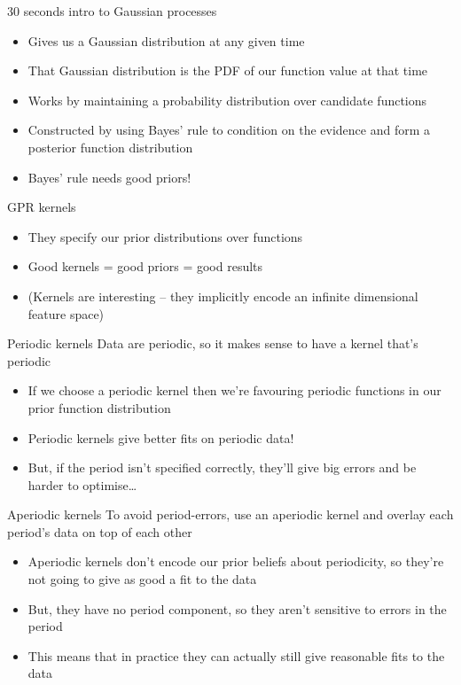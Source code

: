 \documentclass[presentation]{beamer}
\begin{document}
\begin{frame}[label={sec:org773a803}]{30 seconds intro to Gaussian processes}
\begin{itemize}
\item Gives us a Gaussian distribution at any given time
\item That Gaussian distribution is the PDF of our function value at that time
\item Works by maintaining a probability distribution over candidate functions
\item Constructed by using Bayes' rule to condition on the evidence and form a posterior function distribution
\item Bayes' rule needs good priors!
\end{itemize}
\end{frame}

\begin{frame}[label={sec:org6d04eae}]{GPR kernels}
\begin{itemize}
\item They specify our prior distributions over functions
\item Good kernels = good priors = good results
\item (Kernels are interesting -- they implicitly encode an infinite dimensional feature space)
\end{itemize}
\end{frame}

\begin{frame}[label={sec:orgefb0037}]{Periodic kernels}
Data are periodic, so it makes sense to have a kernel that's periodic 

\begin{itemize}
\item If we choose a periodic kernel then we're favouring periodic functions in our prior function distribution
\item Periodic kernels give better fits on periodic data!
\item But, if the period isn't specified correctly, they'll give big errors and be harder to optimise\ldots{}
\end{itemize}
\end{frame}

\begin{frame}[label={sec:org2500959}]{Aperiodic kernels}
To avoid period-errors, use an aperiodic kernel and overlay each period's data on top of each other

\begin{itemize}
\item Aperiodic kernels don't encode our prior beliefs about periodicity, so they're not going to give as good a fit to the data
\item But, they have no period component, so they aren't sensitive to errors in the period
\item This means that in practice they can actually still give reasonable fits to the data
\end{itemize}
\end{frame}
\end{document}
